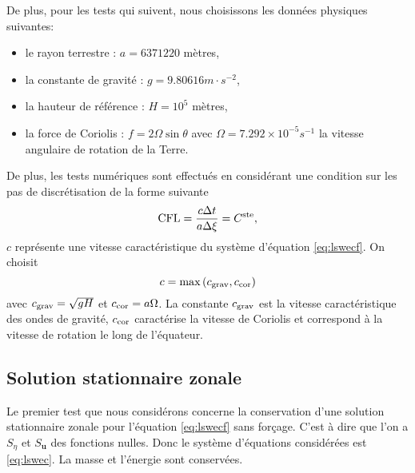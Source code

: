 De plus, pour les tests qui suivent, nous choisissons les données physiques suivantes:
\begin{itemize}
\item le rayon terrestre : $a = 6371220 $ mètres,
\item la constante de gravité : $g = 9.80616 \si{m \cdot s^{-2}}$,
\item la hauteur de référence : $H=10^5$ mètres,
\item la force de Coriolis : $f = 2 \Omega \sin \theta$ avec $\Omega = 7.292 \times 10^{-5} \si{s^{-1}}$ la vitesse angulaire de rotation de la Terre.
\end{itemize}
De plus, les tests numériques sont effectués en considérant une condition sur les pas de discrétisation de la forme suivante 
\begin{equation}
\text{CFL} = \dfrac{c \Delta t}{a \Delta \xi} = C^{\text{ste}},
\end{equation}
$c$ représente une vitesse caractéristique du système d'équation \eqref{eq:lswecf}. On choisit
\begin{equation}
c = \max \left( c_{\text{grav}}, c_{\text{cor}} \right)
\end{equation}
avec $c_{\text{grav}} = \sqrt{gH}$ et $c_{\text{cor}} = a \Omega$. La constante $c_{\text{grav}}$ est la vitesse caractéristique des ondes de gravité, $c_{\text{cor}}$ caractérise la vitesse de Coriolis et correspond à la vitesse de rotation le long de l'équateur.










\subsection{Solution stationnaire zonale}

Le premier test que nous considérons concerne la conservation d'une solution stationnaire zonale pour l'équation \eqref{eq:lswecf} sans forçage. C'est à dire que l'on a $S_{\eta}$ et $S_{\mathbf{u}}$ des fonctions nulles. Donc le système d'équations considérées est \eqref{eq:lswec}. La masse et l'énergie sont conservées.

